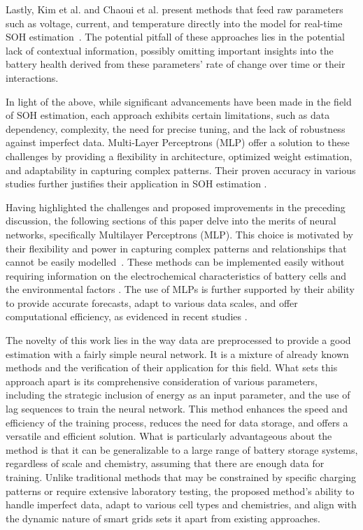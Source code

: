 \documentclass[energies,article,accept,pdftex,moreauthors]{Definitions/mdpi}
\begin{document}
Lastly, Kim et al. and Chaoui et al. present methods that feed raw parameters such as voltage, current, and temperature directly into the model for real-time SOH \mbox{estimation \cite{Kim.2018, Chaoui.2017}}. The potential pitfall of these approaches lies in the potential lack of contextual information, possibly omitting important insights into the battery health derived from these parameters' rate of change over time or their interactions.

In light of the above, while significant advancements have been made in the field of SOH estimation, each approach exhibits certain limitations, such as data dependency, complexity, the need for precise tuning, and the lack of robustness against imperfect data. Multi-Layer Perceptrons (MLP) offer a solution to these challenges by providing a flexibility in architecture, optimized weight estimation, and adaptability in capturing complex patterns. Their proven accuracy in various studies further justifies their application in SOH estimation \cite{Makridakis.2018}. %

Having highlighted the challenges and proposed improvements in the preceding discussion, the following sections of this paper delve into the merits of neural networks, specifically Multilayer Perceptrons (MLP). This choice is motivated by their flexibility and power in capturing complex patterns and relationships that cannot be easily modelled~\cite{How.2019}. These methods can be implemented easily without requiring information on the electrochemical characteristics of battery cells and the environmental factors \cite{HossainLipu.2020}. The use of MLPs is further supported by their ability to provide accurate forecasts, adapt to various data scales, and offer computational efficiency, as evidenced in recent studies \cite{Makridakis.2018}. %

The novelty of this work lies in the way data are preprocessed to provide a good estimation with a fairly simple neural network. It is a mixture of already known methods and the verification of their application for this field. What sets this approach apart is its comprehensive consideration of various parameters, including the strategic inclusion of energy as an input parameter, and the use of lag sequences to train the neural network. This method enhances the speed and efficiency of the training process, reduces the need for data storage, and offers a versatile and efficient solution. What is particularly advantageous about the method is that it can be generalizable to a large range of battery storage systems, regardless of scale and chemistry, assuming that there are enough data for training. Unlike traditional methods that may be constrained by specific charging patterns or require extensive laboratory testing, the proposed method's ability to handle imperfect data, adapt to various cell types and chemistries, and align with the dynamic nature of smart grids sets it apart from existing approaches. %
\end{document}
